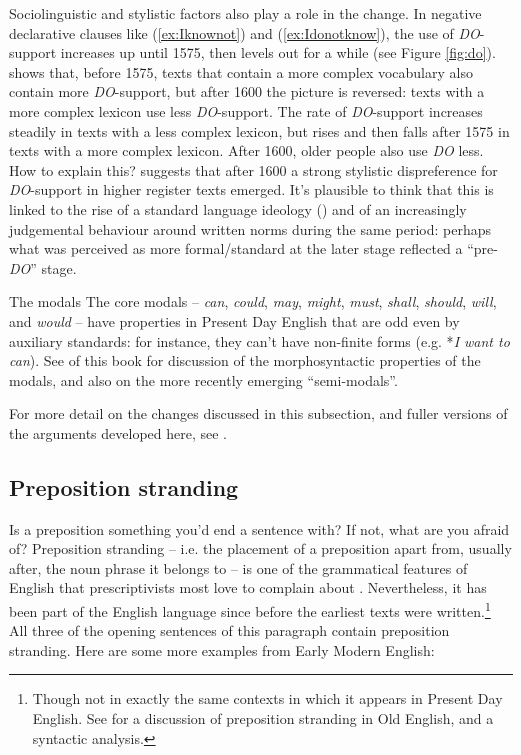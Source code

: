 Sociolinguistic and stylistic factors also play a role in the change. In negative declarative clauses like (\ref{ex:Iknownot}) and (\ref{ex:Idonotknow}), the use of \textit{DO}-support increases up until 1575, then levels out for a while (see Figure \ref{fig:do}). \citet{Warner2005} shows that, before 1575, texts that contain a more complex vocabulary also contain more \textit{DO}-support, but after 1600 the picture is reversed: texts with a more complex lexicon use less \textit{DO}-support. The rate of \textit{DO}-support increases steadily in texts with a less complex lexicon, but rises and then falls after 1575 in texts with a more complex lexicon. After 1600, older people also use \textit{DO} less. How to explain this? \citet{Warner2005} suggests that after 1600 a strong stylistic dispreference for \textit{DO}-support in higher register texts emerged. It's plausible to think that this is linked to the rise of a standard language ideology () and of an increasingly judgemental behaviour around written norms during the same period: perhaps what was perceived as more formal/standard at the later stage reflected a ``pre-\textit{DO}'' stage.


\begin{syntaxbox}{The modals}
The core modals -- \textit{can}, \textit{could}, \textit{may}, \textit{might}, \textit{must}, \textit{shall}, \textit{should}, \textit{will}, and \textit{would} -- have properties in Present Day English that are odd even by auxiliary standards: for instance, they can't have non-finite forms (e.g. *\textit{I want to can}). See  of this book for discussion of the morphosyntactic properties of the modals, and also  on the more recently emerging ``semi-modals''.
\end{syntaxbox}


\noindent For more detail on the changes discussed in this subsection, and fuller versions of the arguments developed here, see \citet[Chapter 4, especially §4.6]{Los2015}.

\subsection{Preposition stranding}\label{EModE-stranding}
\largerpage
Is a preposition something you'd end a sentence with? If not, what are you afraid of? Preposition stranding -- i.e. the placement of a preposition apart from, usually after, the noun phrase it belongs to -- is one of the grammatical features of English that prescriptivists most love to complain about \citep[107--115]{Crystal2006fight}. Nevertheless, it has been part of the English language since before the earliest texts were written.\footnote{Though not in exactly the same contexts in which it appears in Present Day English. See \citet[64--67]{Fischeretal2000} for a discussion of preposition stranding in Old English, and a syntactic analysis.} All three of the opening sentences of this paragraph contain preposition stranding. Here are some more examples from Early Modern English:

